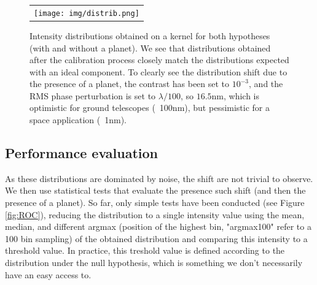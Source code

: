 \documentclass[]{spie}  %
\begin{document}
\begin{figure} [H]
    \begin{center}
    \begin{tabular}{c}
    \texttt{[image: img/distrib.png]}
    \end{tabular}
    \end{center}
    \caption[distrib] 
    { \label{fig:distrib} 
    Intensity distributions obtained on a kernel for both hypotheses (with and without a planet). We see that distributions obtained after the calibration process closely match the distributions expected with an ideal component. To clearly see the distribution shift due to the presence of a planet, the contrast has been set to $10^{-3}$, and the RMS phase perturbation is set to $\lambda / 100$, so $16.5$nm, which is optimistic for ground telescopes (~100nm), but pessimistic for a space application (~1nm).}
\end{figure}

\subsection*{Performance evaluation}

As these distributions are dominated by noise, the shift are not trivial to observe. We then use statistical tests that evaluate the presence such shift (and then the presence of a planet). So far, only simple tests have been conducted (see Figure \ref{fig:ROC}), reducing the distribution to a single intensity value using the mean, median, and different argmax (position of the highest bin, "argmax100" refer to a 100 bin sampling) of the obtained distribution and comparing this intensity to a threshold value. In practice, this treshold value is defined according to the distribution under the null hypothesis, which is something we don't necessarily have an easy access to.
\end{document}
